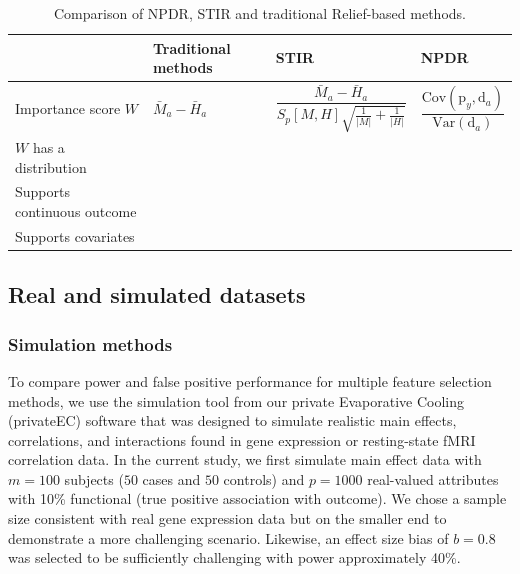 \documentclass[10pt]{article}
\begin{document}
\begin{table}[h]

\begin{tabular}{p{4.5cm}C{2cm}C{3.2cm}C{2.7cm}}
                           & Traditional methods & STIR    & NPDR \\
\hline
Importance score $W$        & $\bar{M}_a - \bar{H}_a    $                      & $\dfrac{\bar{M}_a - \bar{H}_a }{S_p[M,H]\sqrt{\frac{1}{|M|}+\frac{1}{|H|}}}$ &   $\dfrac{\text{Cov}\left( \text{p}_y ,\text{d}_a  \right)}{\text{Var}\left( \text{d}_a  \right)}$ \\
$W$ has a distribution       &                                &      &   \\
Supports continuous outcome &                               &       &   \\
Supports covariates         &                                &       &  \\
\hline
\end{tabular}
\caption{Comparison of NPDR, STIR and traditional Relief-based methods.}
\label{tab:compare_npdr}
\end{table}



\subsection{Real and simulated datasets}




\subsubsection{Simulation methods}
To compare power and false positive performance for multiple feature selection methods, we use the simulation tool from our private Evaporative Cooling (privateEC) software \cite{le17} that was designed to simulate realistic main effects, correlations, and interactions found in gene expression or resting-state fMRI correlation data. In the current study, we first simulate main effect data with $m=100$ subjects ($50$ cases and $50$ controls) and $p=1000$ real-valued attributes with 10\% functional (true positive association with outcome).
We chose a sample size consistent with real gene expression data but on the smaller end to demonstrate a more challenging scenario.
Likewise, an effect size bias of $b=0.8$ was selected to be sufficiently challenging with power approximately 40\%. 
\end{document}
